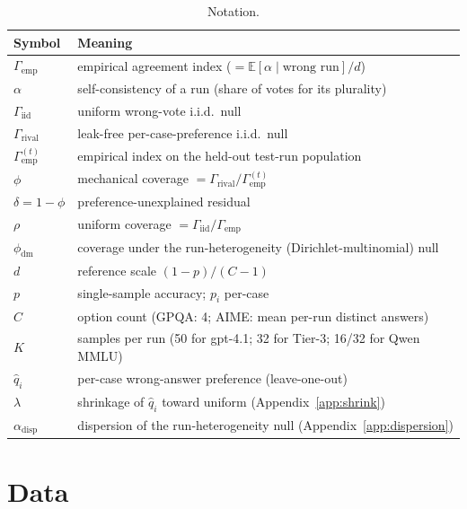 \documentclass[a4paper,fleqn]{cas-sc}
\newcommand{\agreementIndex}{\Gamma}
\begin{document}
\begin{table}[t]
\centering
\caption{Notation.}
\label{tab:notation}
\begin{tabular}{l p{5.5cm}}
\toprule
Symbol & Meaning \\
\midrule
$\agreementIndex_{\mathrm{emp}}$ & empirical agreement index ($=\mathbb{E}[\alpha\mid\text{wrong run}]/d$) \\
$\alpha$ & self-consistency of a run (share of votes for its plurality) \\
$\agreementIndex_{\mathrm{iid}}$ & uniform wrong-vote i.i.d.\ null \\
$\agreementIndex_{\mathrm{rival}}$ & leak-free per-case-preference i.i.d.\ null \\
$\agreementIndex_{\mathrm{emp}}^{(t)}$ & empirical index on the held-out test-run population \\
$\phi$ & mechanical coverage $=\agreementIndex_{\mathrm{rival}}/\agreementIndex_{\mathrm{emp}}^{(t)}$ \\
$\delta=1-\phi$ & preference-unexplained residual \\
$\rho$ & uniform coverage $=\agreementIndex_{\mathrm{iid}}/\agreementIndex_{\mathrm{emp}}$ \\
$\phi_{\mathrm{dm}}$ & coverage under the run-heterogeneity (Dirichlet-multinomial) null \\
$d$ & reference scale $(1-p)/(C-1)$ \\
$p$ & single-sample accuracy; $p_i$ per-case \\
$C$ & option count (GPQA: 4; AIME: mean per-run distinct answers) \\
$K$ & samples per run (50 for gpt-4.1; 32 for Tier-3; 16/32 for Qwen MMLU) \\
$\hat q_i$ & per-case wrong-answer preference (leave-one-out) \\
$\lambda$ & shrinkage of $\hat q_i$ toward uniform (Appendix~\ref{app:shrink}) \\
$\alpha_{\mathrm{disp}}$ & dispersion of the run-heterogeneity null (Appendix~\ref{app:dispersion}) \\
\bottomrule
\end{tabular}
\end{table}

\section{Data}
\label{sec:data}
\end{document}
